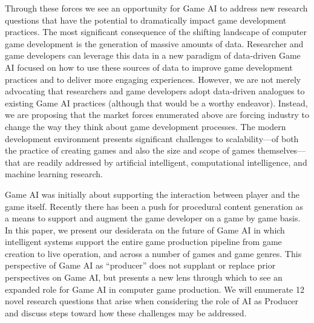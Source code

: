 \documentclass[conference]{IEEEtran}
\newcommand{\mytodo}[1]{\textbf{[[#1]]}}
\begin{document}
Through these forces we see an opportunity for Game AI to address new research questions that have the potential to dramatically impact game development practices.
%
The most significant consequence of the shifting landscape of computer game development is the generation of massive amounts of data. 
Researcher and game developers can leverage this data in a new paradigm of data-driven Game AI focused on how to use these sources of data to 
improve game development practices and to deliver more engaging experiences.
However, we are not merely advocating that researchers and game developers adopt data-driven analogues to existing Game AI practices (although that would be a worthy endeavor).
Instead, we are proposing that the market forces enumerated above are forcing industry to change the way they think about game development processes.
The modern development environment presents significant challenges to scalability---of both the practice of creating games and also the size and scope of games themselves---that are readily addressed by artificial intelligent, computational intelligence, and machine learning research.

Game AI was initially about supporting the interaction between player and the game itself.
Recently there has been a push for procedural content generation as a means to support and augment the game developer on a game by game basis.
%
In this paper, we present our desiderata on the future of Game AI
in which intelligent systems support the entire game production pipeline from game creation to live operation, and across a number of games and game genres.
This perspective of Game AI as ``producer'' does not supplant or replace prior perspectives on Game AI, but presents a new lens through which to see an expanded role for Game AI in computer game production. 
We will enumerate 12 novel research questions that arise when considering the role of AI as Producer and discuss steps toward how these challenges may be addressed. 
\end{document}
